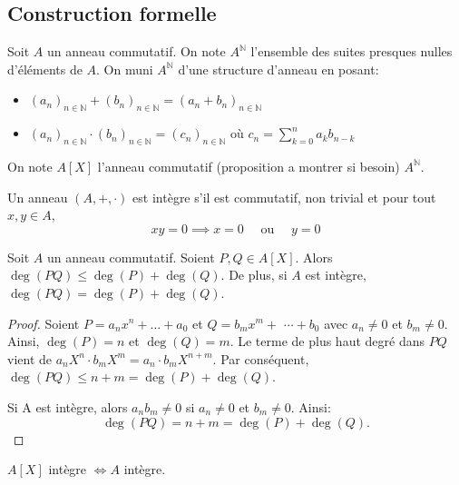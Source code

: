 \subsection{Construction formelle}

\begin{definition}

	Soit $A$ un anneau commutatif. On note $A^{\mathbb{N}}$ l'ensemble des suites presques nulles d'éléments de $A$.
	On muni $A^{\mathbb{N}}$ d'une structure d'anneau en posant:
	\begin{itemize}
		\item $(a_n)_{n \in \mathbb{N}} + (b_n)_{n \in \mathbb{N}} = (a_n + b_n)_{n \in \mathbb{N}}$
		\item $(a_n)_{n \in \mathbb{N}} \cdot (b_n)_{n \in \mathbb{N}} = (c_n)_{n \in \mathbb{N}}$ où $c_n = \sum_{k=0}^{n} a_k b_{n-k}$
	\end{itemize}

	On note $A[X]$ l'anneau commutatif (proposition a montrer si besoin)  $A^{\mathbb{N}}$.

\end{definition}

\begin{definition}
	Un anneau $(A, +, \cdot)$ est intègre s'il est commutatif, non trivial et pour tout $x, y \in A$,
	\begin{equation*}
		xy = 0 \implies x = 0 \quad \text{ ou } \quad y = 0
	\end{equation*}
\end{definition}

\begin{prop}
	Soit $A$ un anneau commutatif.
	Soient $P, Q \in A[X]$. Alors $\deg(PQ) \leq \deg(P) + \deg(Q)$.
	De plus, si $A$ est intègre, $\deg(PQ) = \deg(P) + \deg(Q)$.
\end{prop}

\begin{proof}
	Soient $P=a_n x^n+\ldots+a_0$ et $Q=b_m x^m+$ $\cdots+b_0$ avec $a_n \neq 0$ et $b_m \neq 0$.
	Ainsi, $\deg(P)=n$ et $\deg(Q)=m$. Le terme de plus haut degré dans $P Q$ vient de $a_n X^n \cdot b_m X^m=a_n \cdot b_m X^{n+m}$.
	Par conséquent, $\deg(P Q) \leq n+m=\deg(P)+\deg(Q)$.

	Si A est intègre, alors $a_n b_m \neq 0$ si $a_n \neq 0$ et $b_m \neq 0$. Ainsi:
	$$
		\deg(P Q)=n+m=\deg(P)+\deg(Q).
	$$
\end{proof}

\begin{coro}
	$A[X]$ intègre $\iff A$ intègre.
\end{coro}

